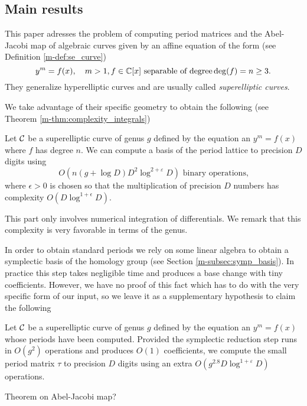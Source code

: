 \documentclass[main.tex]{subfiles}
\begin{document}
  \subsection{Main results}

  This paper adresses the problem of computing period matrices and the
  Abel-Jacobi map of algebraic curves given by an affine equation of the form  (see Definition \ref{m-def:se_curve})
  \begin{equation*}
  y^m = f(x), \quad m > 1, f \in \mathbb{C}[x] \text{ separable of degree} \operatorname{deg}(f) = n \ge 3.
  \end{equation*}
  They generalize
  hyperelliptic curves and are usually called \textit{superelliptic curves}.

  We take advantage of their specific geometry to obtain the following
  (see Theorem \ref{m-thm:complexity_integrals})
  \begin{thm}
      Let $\mathcal{C}$ be a superelliptic curve of genus $g$ defined by the equation an $y^m=f(x)$
      where $f$ has degree $n$.
      We can compute a basis of the period lattice to precision
      $D$ digits using $$O(n(g+\log D)D^2\log^{2+\varepsilon} D) \text{ binary operations,}$$
     where $\epsilon>0$ is chosen so that
      the multiplication of precision $D$ numbers has complexity
      $O(D\log^{1+\epsilon}D)$.
  \end{thm}

  This part only involves numerical integration of differentials. We remark
  that this complexity is very favorable in terms of the genus.

  In order
  to obtain standard periods we rely on some linear algebra to obtain a
  symplectic basis of the homology group (see Section \ref{m-subsec:symp_basis}).
  In practice this step takes negligible time
  and produces a base change with tiny coefficients. However, we have no proof
  of this fact which has to do with the very specific form of our input,
  so we leave it as a supplementary hypothesis to claim the
  following
  \begin{thm}
     Let $\mathcal{C}$ be a superelliptic curve of genus $g$ defined by the equation an $y^m=f(x)$ whose periods
      have been computed.
      Provided the symplectic reduction
      step runs in $O(g^2)$ operations and produces $O(1)$ coefficients,
      we compute the small period matrix $τ$ to precision $D$
      digits using an extra $O(g^{2.8}D\log^{1+\varepsilon}D)$ operations.
  \end{thm}

  \todo Theorem on Abel-Jacobi map?
\end{document}

